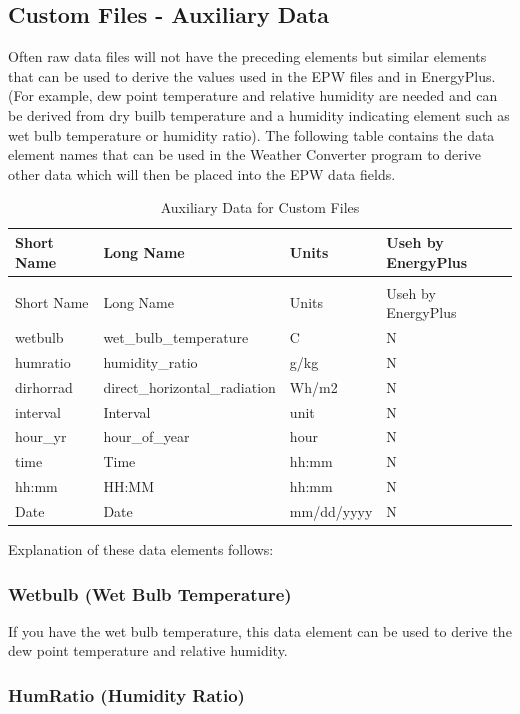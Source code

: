 \subsection{Custom Files - Auxiliary Data}\label{custom-files---auxiliary-data}

Often raw data files will not have the preceding elements but similar elements that can be used to derive the values used in the EPW files and in EnergyPlus. (For example, dew point temperature and relative humidity are needed and can be derived from dry builb temperature and a humidity indicating element such as wet bulb temperature or humidity ratio). The following table contains the data element names that can be used in the Weather Converter program to derive other data which will then be placed into the EPW data fields.

\begin{longtable}[c]{p{1.5in}p{1.5in}p{1.5in}p{1.5in}}
\caption{Auxiliary Data for Custom Files \label{table:auxiliary-data-for-custom-files}} \tabularnewline
\toprule 
Short Name & Long Name & Units & Useh by EnergyPlus \tabularnewline
\midrule
\endfirsthead

\caption[]{Auxiliary Data for Custom Files} \tabularnewline
\toprule 
Short Name & Long Name & Units & Useh by EnergyPlus \tabularnewline
\midrule
\endhead

wetbulb & wet\_bulb\_temperature & C & N \tabularnewline
humratio & humidity\_ratio & g/kg & N \tabularnewline
dirhorrad & direct\_horizontal\_radiation & Wh/m2 & N \tabularnewline
interval & Interval & unit & N \tabularnewline
hour\_yr & hour\_of\_year & hour & N \tabularnewline
time & Time & hh:mm & N \tabularnewline
hh:mm & HH:MM & hh:mm & N \tabularnewline
Date & Date & mm/dd/yyyy & N \tabularnewline
\bottomrule
\end{longtable}

Explanation of these data elements follows:

\subsubsection{Wetbulb (Wet Bulb Temperature)}\label{wetbulb-wet-bulb-temperature}

If you have the wet bulb temperature, this data element can be used to derive the dew point temperature and relative humidity.

\subsubsection{HumRatio (Humidity Ratio)}\label{humratio-humidity-ratio}

